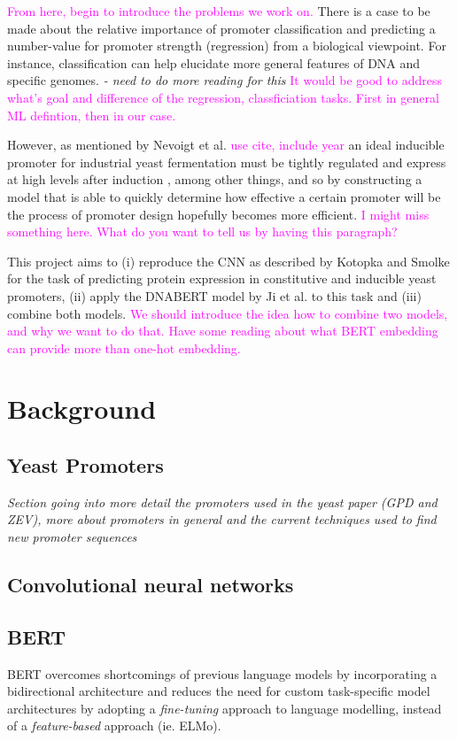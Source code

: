\documentclass{article}
\newcommand{\mengyan}[1]{\textcolor{magenta}{#1}}
\begin{document}
\mengyan{From here, begin to introduce the problems we work on.}
There is a case to be made about the relative importance of promoter classification and predicting a number-value for promoter strength (regression) from a biological viewpoint. 
For instance, classification can help elucidate more general features of DNA and specific genomes. \textit{- need to do more reading for this}
\mengyan{It would be good to address what's goal and difference of the regression, classficiation tasks. First in general ML defintion, then in our case.}

However, as mentioned by Nevoigt et al. \mengyan{use cite, include year} an ideal inducible promoter for industrial yeast fermentation must be tightly regulated and express at high levels after induction \cite{nevoight2007promoter}, among other things, and so by constructing a model that is able to quickly determine how effective a certain promoter will be the process of promoter design hopefully becomes more efficient.
\mengyan{I might miss something here. What do you want to tell us by having this paragraph?}

This project aims to (i) reproduce the CNN as described by Kotopka and Smolke for the task of predicting protein expression in constitutive and inducible yeast promoters, (ii) apply the DNABERT model by Ji et al. to this task and (iii) combine both models.
\mengyan{We should introduce the idea how to combine two models, and why we want to do that. Have some reading about what BERT embedding can provide more than one-hot embedding.}
 

\section{Background}
\subsection{Yeast Promoters}
\textit{Section going into more detail the promoters used in the yeast paper (GPD and ZEV), more about promoters in general and the current techniques used to find new promoter sequences}

\subsection{Convolutional neural networks}

\subsection{BERT}
BERT overcomes shortcomings of previous language models by incorporating a bidirectional architecture and reduces the need for custom task-specific model architectures by adopting a  \textit{fine-tuning} approach to language modelling, instead of a \textit{feature-based} approach (ie. ELMo). 
\end{document}

